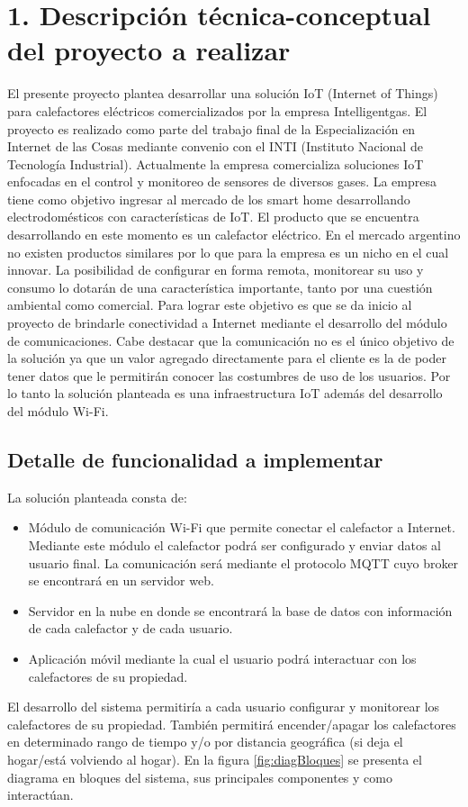 \documentclass[
11pt, %
codirector, %
]{charter}
\begin{document}
\pagebreak
\section{1. Descripción técnica-conceptual del proyecto a realizar}
\label{sec:descripcion}
El presente proyecto plantea desarrollar una solución IoT (Internet of 
Things) para calefactores eléctricos comercializados por la empresa Intelligentgas.
El proyecto es realizado como parte del trabajo final de la Especialización en Internet de las Cosas mediante convenio con el INTI (Instituto Nacional de Tecnología Industrial).
Actualmente la empresa comercializa soluciones IoT enfocadas en el control y monitoreo de sensores de diversos gases. La empresa tiene como objetivo ingresar al mercado de los smart home desarrollando electrodomésticos con características de IoT. El producto que se encuentra desarrollando en este momento es un calefactor eléctrico. 
En el mercado argentino no existen productos similares por lo que para la empresa es un nicho en el cual innovar.
La posibilidad de configurar en forma remota, monitorear su uso y consumo lo dotarán de una característica importante, tanto por una cuestión ambiental como comercial.
Para lograr este objetivo es que se da inicio al proyecto de brindarle conectividad a Internet mediante el desarrollo del módulo de comunicaciones. Cabe destacar que la comunicación no es el único objetivo de la solución ya que un valor agregado directamente para el cliente es la de poder tener datos que le permitirán conocer las costumbres de uso de los usuarios. 
Por lo tanto la solución planteada es una infraestructura IoT además del desarrollo del módulo Wi-Fi.

\subsection{Detalle de funcionalidad a implementar}
La solución planteada consta de:
 \begin{itemize}
 \item Módulo de comunicación Wi-Fi que permite conectar el calefactor a Internet. Mediante este módulo el calefactor podrá ser configurado y enviar datos al usuario final. La comunicación será mediante el protocolo MQTT cuyo broker se encontrará en  un servidor web. 
 \item Servidor en la nube en donde se encontrará la base de datos con información de cada calefactor y de cada usuario.
 \item Aplicación móvil mediante la cual el usuario podrá interactuar con los calefactores de su propiedad.
 \end{itemize}
 El desarrollo del sistema permitiría a cada usuario configurar y monitorear los calefactores de su propiedad. También permitirá encender/apagar los calefactores en determinado rango de tiempo y/o por distancia geográfica (si deja el hogar/está volviendo al hogar).
En la figura \ref{fig:diagBloques} se presenta el diagrama en bloques del sistema, sus principales componentes y como interactúan.
\end{document}
